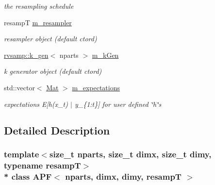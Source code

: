 \begin{DoxyCompactItemize}
\begin{DoxyCompactList}\small\item\em the resampling schedule \end{DoxyCompactList}\item 
resampT \hyperlink{classAPF_a28240f2cee9166dd043065947c6b8091}{m\+\_\+resampler}\hypertarget{classAPF_a28240f2cee9166dd043065947c6b8091}{}\label{classAPF_a28240f2cee9166dd043065947c6b8091}

\begin{DoxyCompactList}\small\item\em resampler object (default ctor\textquotesingle{}d) \end{DoxyCompactList}\item 
\hyperlink{classrvsamp_1_1k__gen}{rvsamp\+::k\+\_\+gen}$<$ nparts $>$ \hyperlink{classAPF_a9e34bb39a9fe783fe85a36fbab60bd7e}{m\+\_\+k\+Gen}\hypertarget{classAPF_a9e34bb39a9fe783fe85a36fbab60bd7e}{}\label{classAPF_a9e34bb39a9fe783fe85a36fbab60bd7e}

\begin{DoxyCompactList}\small\item\em k generator object (default ctor\textquotesingle{}d) \end{DoxyCompactList}\item 
std\+::vector$<$ \hyperlink{classAPF_a8e867c46870835e2103aee00f13f0be7}{Mat} $>$ \hyperlink{classAPF_a54c085c93b9398da910ff58a714d24de}{m\+\_\+expectations}\hypertarget{classAPF_a54c085c93b9398da910ff58a714d24de}{}\label{classAPF_a54c085c93b9398da910ff58a714d24de}

\begin{DoxyCompactList}\small\item\em expectations E\mbox{[}h(x\+\_\+t) $\vert$ y\+\_\+\{1\+:t\}\mbox{]} for user defined \char`\"{}h\char`\"{}s \end{DoxyCompactList}\end{DoxyCompactItemize}


\subsection{Detailed Description}
\subsubsection*{template$<$size\+\_\+t nparts, size\+\_\+t dimx, size\+\_\+t dimy, typename resampT$>$\\*
class A\+P\+F$<$ nparts, dimx, dimy, resamp\+T $>$}

